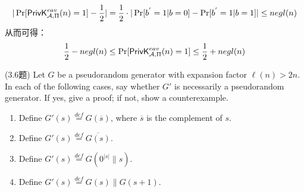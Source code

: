 \begin{questions}
\begin{solution}
            \begin{equation}
                \begin{aligned}
                    |\Pr[\mathsf{PrivK}^{eav}_{\mathcal{A},\Pi}(n)=1]-\frac{1}{2}|=\frac{1}{2}\cdot|\Pr[{b}^{'}=1|b=0]-\Pr[{b}^{'}=1|b=1]|\leq{negl}(n)
                \end{aligned}
            \end{equation}
            从而可得：
            \begin{equation}
                \begin{aligned}
                    \frac{1}{2}-negl(n)\leq\Pr[\mathsf{PrivK}^{eav}_{\mathcal{A},\Pi}(n)=1]\leq\frac{1}{2}+negl(n)
                \end{aligned}
            \end{equation}
        \end{solution}

    \question (3.6题) Let $G$ be a pseudorandom generator with expansion factor $\ell(n)>2n$. In each of the following cases, say whether $G'$ is necessarily a pseudorandom generator. If yes, give a proof; if not, show a counterexample.

        \begin{enumerate}
            \item Define $G'(s)\overset{def}{=}G(\overline{s})$, where $\overline{s}$ is the complement of $s$.
            \item Define $G'(s)\overset{def}{=}\overline{G(s)}$.
            \item Define $G'(s)\overset{def}{=}G(0^{|s|}\parallel{s})$.
            \item Define $G'(s)\overset{def}{=}G(s)\parallel{G(s+1)}$.
        \end{enumerate}


\end{questions}
